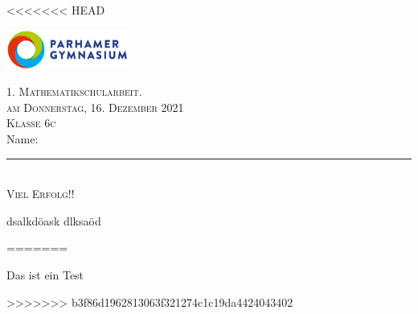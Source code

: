 \documentclass[a4paper,12pt]{article}
\begin{document}
<<<<<<< HEAD
\begin{titlepage}
\begin{flushright}
\includegraphics[width=0.3\textwidth]{logo.eps}

\Huge \textsc{1. Mathematikschularbeit.} \\

\textsc{\Large am Donnerstag, 16. Dezember 2021} \\

\textsc{\Large Klasse 6c} \\ [0.5cm]

\Large Name: \rule{8cm}{0.4pt} \\

\Large \textsc{Viel Erfolg!!}
\end{flushright}

\vfil 

%
%
%


\end{titlepage}
				
				
				
dsalkdöask
dlksaöd


=======
\begin{beispiel}{0} %
Das ist ein Test  


\end{beispiel}
>>>>>>> b3f86d1962813063f321274c1c19da4424043402
\end{document}
